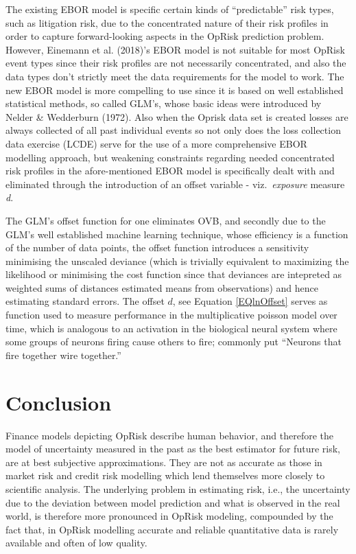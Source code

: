 \documentclass{DissertateUSU}
\begin{document}
The existing EBOR model is specific certain kinds of ``predictable''
risk types, such as litigation risk, due to the concentrated nature of
their risk profiles in order to capture forward-looking aspects in the
OpRisk prediction problem. However, Einemann et al. (2018)'s EBOR model
is not suitable for most OpRisk event types since their risk profiles
are not necessarily concentrated, and also the data types don't strictly
meet the data requirements for the model to work. The new EBOR model is
more compelling to use since it is based on well established statistical
methods, so called GLM's, whose basic ideas were introduced by Nelder \&
Wedderburn (1972). Also when the Oprisk data set is created losses are
always collected of all past individual events so not only does the loss
collection data exercise (LCDE) serve for the use of a more
comprehensive EBOR modelling approach, but weakening constraints
regarding needed concentrated risk profiles in the afore-mentioned EBOR
model is specifically dealt with and eliminated through the introduction
of an offset variable - viz.~\emph{exposure} measure \emph{d}.\medskip

The GLM's offset function for one eliminates OVB, and secondly due to
the GLM's well established machine learning technique, whose efficiency
is a function of the number of data points, the offset function
introduces a sensitivity minimising the unscaled deviance (which is
trivially equivalent to maximizing the likelihood or minimising the cost
function since that deviances are intepreted as weighted sums of
distances estimated means from observations) and hence estimating
standard errors. The offset \(d\), see Equation \ref{EQlnOffset} serves
as function used to measure performance in the multiplicative poisson
model over time, which is analogous to an activation in the biological
neural system where some groups of neurons firing cause others to fire;
commonly put ``Neurons that fire together wire together.''

\section{Conclusion}
\label{sec:Conclusion}

Finance models depicting OpRisk describe human behavior, and therefore
the model of uncertainty measured in the past as the best estimator for
future risk, are at best subjective approximations. They are not as
accurate as those in market risk and credit risk modelling which lend
themselves more closely to scientific analysis. The underlying problem
in estimating risk, i.e., the uncertainty due to the deviation between
model prediction and what is observed in the real world, is therefore
more pronounced in OpRisk modeling, compounded by the fact that, in
OpRisk modelling accurate and reliable quantitative data is rarely
available and often of low quality.\medskip
\end{document}
